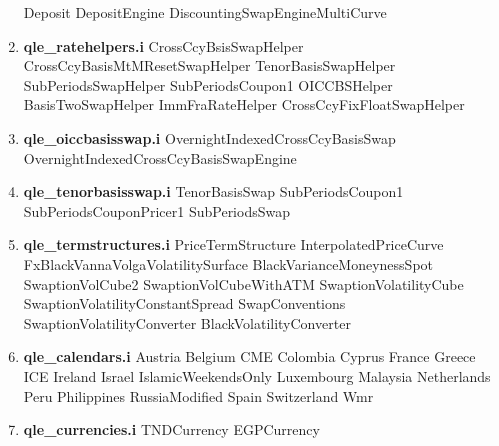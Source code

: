\documentclass[10pt]{article}
\begin{document}
\begin{multicols}{2}
\begin{enumerate}
                \subitem Deposit
                \subitem DepositEngine
                \subitem DiscountingSwapEngineMultiCurve
        \item \textbf{qle\_ratehelpers.i}
                \subitem CrossCcyBsisSwapHelper
                \subitem CrossCcyBasisMtMResetSwapHelper
                \subitem TenorBasisSwapHelper
                \subitem SubPeriodsSwapHelper
                \subitem SubPeriodsCoupon1
                \subitem OICCBSHelper
                \subitem BasisTwoSwapHelper
                \subitem ImmFraRateHelper
                \subitem CrossCcyFixFloatSwapHelper
        \item \textbf{qle\_oiccbasisswap.i}
                \subitem OvernightIndexedCrossCcyBasisSwap
                \subitem OvernightIndexedCrossCcyBasisSwapEngine
        \item \textbf{qle\_tenorbasisswap.i}
                \subitem TenorBasisSwap
                \subitem SubPeriodsCoupon1
                \subitem SubPeriodsCouponPricer1
                \subitem SubPeriodsSwap
        \item \textbf{qle\_termstructures.i}
                \subitem PriceTermStructure
                \subitem InterpolatedPriceCurve
                \subitem FxBlackVannaVolgaVolatilitySurface
                \subitem BlackVarianceMoneynessSpot
                \subitem SwaptionVolCube2
                \subitem SwaptionVolCubeWithATM
                \subitem SwaptionVolatilityCube
                \subitem SwaptionVolatilityConstantSpread
                \subitem SwapConventions
                \subitem SwaptionVolatilityConverter
                \subitem BlackVolatilityConverter    
        \item \textbf{qle\_calendars.i}
                \subitem Austria
                \subitem Belgium
                \subitem CME
                \subitem Colombia
                \subitem Cyprus
                \subitem France
                \subitem Greece
                \subitem ICE
                \subitem Ireland
                \subitem Israel
                \subitem IslamicWeekendsOnly
                \subitem Luxembourg
                \subitem Malaysia
                \subitem Netherlands
                \subitem Peru
                \subitem Philippines
                \subitem RussiaModified
                \subitem Spain
                \subitem Switzerland
                \subitem Wmr
        \item \textbf{qle\_currencies.i}
                \subitem TNDCurrency
                \subitem EGPCurrency

\end{enumerate}
\end{multicols}
\end{document}
